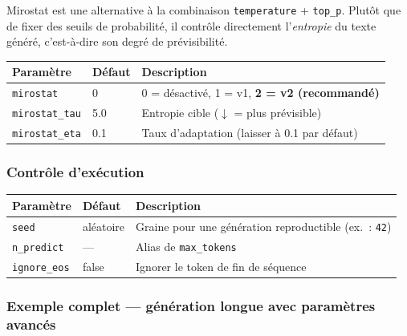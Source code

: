 \documentclass[12pt, a4paper, twoside]{article}
\begin{document}
Mirostat est une alternative à la combinaison \texttt{temperature} + \texttt{top\_p}. Plutôt
que de fixer des seuils de probabilité, il contrôle directement l'\textit{entropie} du texte
généré, c'est-à-dire son degré de prévisibilité.

\begin{center}
\begin{tabular}{L{3.5cm} C{1.5cm} L{8cm}}
  \toprule
  \textbf{Paramètre} & \textbf{Défaut} & \textbf{Description} \\
  \midrule
  \texttt{mirostat}     & 0   & 0 = désactivé, 1 = v1, \textbf{2 = v2 (recommandé)} \\
  \texttt{mirostat\_tau}& 5.0 & Entropie cible ($\downarrow$ = plus prévisible) \\
  \texttt{mirostat\_eta}& 0.1 & Taux d'adaptation (laisser à 0.1 par défaut) \\
  \bottomrule
\end{tabular}
\end{center}

\subsubsection{Contrôle d'exécution}

\begin{center}
\begin{tabular}{L{3cm} C{2cm} L{8.5cm}}
  \toprule
  \textbf{Paramètre} & \textbf{Défaut} & \textbf{Description} \\
  \midrule
  \texttt{seed}        & aléatoire & Graine pour une génération reproductible (ex.~: \texttt{42}) \\
  \texttt{n\_predict}  & ---        & Alias de \texttt{max\_tokens} \\
  \texttt{ignore\_eos} & false      & Ignorer le token de fin de séquence \\
  \bottomrule
\end{tabular}
\end{center}

\subsubsection{Exemple complet — génération longue avec paramètres avancés}
\end{document}
